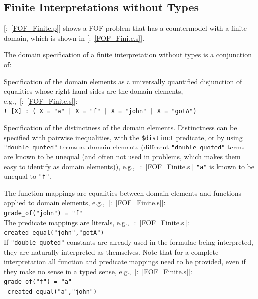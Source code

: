\documentclass{ceurart}
\newcommand{\smalltt}[1]{\small \texttt{#1}}
\newcommand{\example}{{\scriptsize \faFile[regular]}}
\newcommand{\tildenot}{\raisebox{0.4ex}{\texttildelow}}
\newenvironment{packed_itemize}{
\vspace*{-0.3em}
\begin{itemize}
\setlength{\partopsep}{0pt}
\setlength{\itemsep}{1pt}
\setlength{\parskip}{0pt}
\setlength{\parsep}{0pt}
}{\end{itemize}}
\begin{document}
\subsection{Finite Interpretations without Types}
\label{FOFTarskian}

[\example{}:~\ref{FOF_Finite.p}] shows a FOF problem that has a countermodel with a finite 
domain, which is shown in [\example{}:~\ref{FOF_Finite.s}].

The domain specification of a finite interpretation without types is a conjunction of:
\begin{packed_itemize}
\item Specification of the domain elements as a universally quantified disjunction of equalities 
      whose right-hand sides are the domain elements, 
      e.g.,~[\example{}:~\ref{FOF_Finite.s}]:\\
      \hspace*{0.5cm}\smalltt{! [X] : ( X = "a" | X = "f" | X = "john" | X = "gotA")}
\item Specification of the distinctness of the domain elements.
      Distinctness can be specified with pairwise inequalities, with the \smalltt{\$distinct} 
      predicate, or by using \smalltt{"double quoted"} terms as domain elements (different 
      \smalltt{"double quoted"} terms are known to be unequal (and often not used in problems,
      which makes them easy to identify as domain elements)),
      e.g.,~[\example{}:~\ref{FOF_Finite.s}] \smalltt{"a"} is known to be unequal to \smalltt{"f"}.
\end{packed_itemize}

The function mappings are equalities between domain elements and functions applied to domain 
elements,
e.g.,~[\example{}:~\ref{FOF_Finite.s}]: \\
\hspace*{0.5cm}\smalltt{grade\_of("john") = "f"}\\
The predicate mappings are literals, e.g.,~[\example{}:~\ref{FOF_Finite.s}]: \\
\hspace*{0.5cm}\smalltt{created\_equal("john","gotA")}\\
If \smalltt{"double quoted"} constants are already used in the formulae being interpreted, they
are naturally interpreted as themselves.
Note that for a complete interpretation all function and predicate mappings need to be provided,
even if they make no sense in a typed sense, e.g.,~[\example{}:~\ref{FOF_Finite.s}]: \\
\hspace*{0.5cm}\smalltt{grade\_of("f") = "a"}\\
\hspace*{0.5cm}\smalltt{\tildenot{}\,created\_equal("a","john")}
\end{document}
